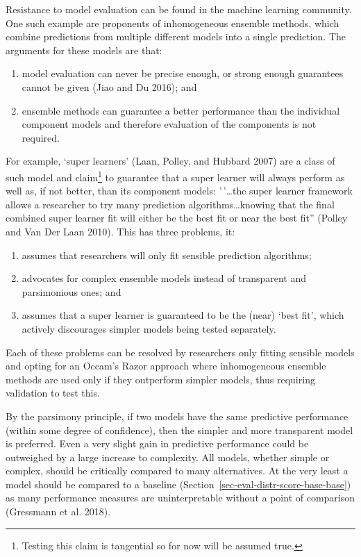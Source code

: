 \documentclass[
  letterpaper,
]{scrbook}
\providecommand{\tightlist}{%
  \setlength{\itemsep}{0pt}\setlength{\parskip}{0pt}}\usepackage{longtable,booktabs,array}
\theoremstyle{plain}
\theoremstyle{definition}
\theoremstyle{remark}
\begin{document}
Resistance to model evaluation can be found in the machine learning
community. One such example are proponents of inhomogeneous ensemble
methods, which combine predictions from multiple different models into a
single prediction. The arguments for these models are that:

\begin{enumerate}
\def\labelenumi{\roman{enumi}.}
\tightlist
\item
  model evaluation can never be precise enough, or strong enough
  guarantees cannot be given (Jiao and Du 2016); and
\item
  ensemble methods can guarantee a better performance than the
  individual component models and therefore evaluation of the components
  is not required.
\end{enumerate}

For example, `super learners' (Laan, Polley, and Hubbard 2007) are a
class of such model and claim\footnote{Testing this claim is tangential
  so for now will be assumed true.} to guarantee that a super learner
will always perform as well as, if not better, than its component
models: '\,'\ldots the super learner framework allows a researcher to
try many prediction algorithms\ldots knowing that the final combined
super learner fit will either be the best fit or near the best fit''
(Polley and Van Der Laan 2010). This has three problems, it:

\begin{enumerate}
\def\labelenumi{\roman{enumi}.}
\tightlist
\item
  assumes that researchers will only fit sensible prediction algorithms;
\item
  advocates for complex ensemble models instead of transparent and
  parsimonious ones; and
\item
  assumes that a super learner is guaranteed to be the (near) `best
  fit', which actively discourages simpler models being tested
  separately.
\end{enumerate}

Each of these problems can be resolved by researchers only fitting
sensible models and opting for an Occam's Razor approach where
inhomogeneous ensemble methods are used only if they outperform simpler
models, thus requiring validation to test this.

By the parsimony principle, if two models have the same predictive
performance (within some degree of confidence), then the simpler and
more transparent model is preferred. Even a very slight gain in
predictive performance could be outweighed by a large increase to
complexity. All models, whether simple or complex, should be critically
compared to many alternatives. At the very least a model should be
compared to a baseline (Section~\ref{sec-eval-distr-score-base-base}) as
many performance measures are uninterpretable without a point of
comparison (Gressmann et al. 2018).
\end{document}
